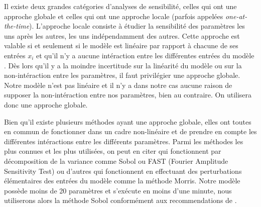 Il existe deux grandes catégories d'analyses de sensibilité, celles qui ont une approche globale et celles qui ont une approche locale (parfois appelées \emph{one-at-the-time}).
L'approche locale consiste à étudier la sensibilité des paramètres les uns après les autres, les uns indépendamment des autres.
Cette approche est valable si et seulement si le modèle est linéaire par rapport à chacune de ses entrées $x_i$ et qu'il n'y a aucune intéraction entre les différentes entrées du modèle \citep{saltelli2019so}.
Dès lors qu'il y a la moindre incertitude sur la linéarité du modèle ou sur la non-intéraction entre les paramètres, il faut privilégier une approche globale.
Notre modèle n'est pas linéaire et il n'y a dans notre cas aucune raison de supposer la non-intéraction entre nos paramètres, bien au contraire.
On utilisera donc une approche globale.

Bien qu'il existe plusieurs méthodes ayant une approche globale, elles ont toutes en commun de fonctionner dans un cadre non-linéaire et de prendre en compte les différentes intéractions entre les différents paramètres.
Parmi les méthodes les plus connues et les plus utilisées, on peut en citer qui fonctionnent par décomposition de la variance comme Sobol ou FAST (Fourier Amplitude Sensitivity Test) ou d'autres qui fonctionnent en effectuant des perturbations élémentaires des entrées du modèle comme la méthode Morris.
Notre modèle possède moins de 20 paramètres et s'exécute en moins d'une minute, nous utiliserons alors la méthode Sobol conformément aux recommendations de \citet[chap. 6]{saltelli}.

